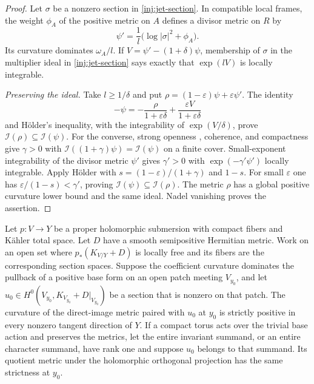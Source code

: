 \begin{proof}
Let $\sigma$ be a nonzero section in \eqref{inj:jet-section}. In compatible
local frames, the weight $\phi_A$ of the positive metric on $A$ defines a divisor
metric on $R$ by
\[
 \psi'=\frac{1}{l}\bigl(\log|\sigma|^2+\phi_A\bigr).
\]
Its curvature dominates $\omega_A/l$. If
$V=\psi'-(1+\delta)\psi$, membership of $\sigma$ in the multiplier ideal
in \eqref{inj:jet-section} says exactly that $\exp(lV)$ is locally
integrable.

\smallskip\noindent\textit{Preserving the ideal.} Take
$l\ge1/\delta$ and put
$\rho=(1-\varepsilon)\psi+\varepsilon\psi'$.  The identity
\[
 -\psi=-\frac{\rho}{1+\varepsilon\delta}
             +\frac{\varepsilon V}{1+\varepsilon\delta}
\]
and H\"older's inequality, with the integrability of
$\exp(V/\delta)$, prove
$\mathcal I(\rho)\subseteq\mathcal I(\psi)$.
For the converse, strong openness
\cite[Theorem 1.1]{GuanZhou2015}, coherence, and compactness give
$\gamma>0$ with
$\mathcal I((1+\gamma)\psi)=\mathcal I(\psi)$ on a finite cover.
Small-exponent integrability of the divisor metric $\psi'$ gives
$\gamma'>0$ with $\exp(-\gamma'\psi')$ locally integrable.
Apply H\"older with
$s=(1-\varepsilon)/(1+\gamma)$ and $1-s$.  For small
$\varepsilon$ one has $\varepsilon/(1-s)<\gamma'$, proving
$\mathcal I(\psi)\subseteq\mathcal I(\rho)$.
The metric $\rho$ has a global positive curvature lower bound and
the same ideal.  Nadel vanishing proves the assertion.
\end{proof}

\begin{lemma}
\label{inj:strict-direct-image}
Let $p:V\to Y$ be a proper holomorphic submersion with compact fibers
and K\"ahler total space.  Let $D$ have a smooth semipositive
Hermitian metric.  Work on an open set where
$p_*(K_{V/Y}+D)$ is locally free and its fibers are the corresponding
section spaces.  Suppose the coefficient curvature dominates the
pullback of a positive base form on an open patch meeting $V_{y_0}$,
and let $u_0\in H^0(V_{y_0},K_{V_{y_0}}+D|_{V_{y_0}})$ be a
section that is nonzero on that patch. The curvature of the
direct-image metric paired with $u_0$ at $y_0$ is strictly positive
in every nonzero tangent direction of $Y$.
If a compact torus acts over the trivial base action and preserves the
metrics, let the entire invariant summand, or an entire character
summand, have rank one and suppose $u_0$ belongs to that summand.
Its quotient metric under the holomorphic orthogonal projection has
the same strictness at $y_0$.
\end{lemma}

